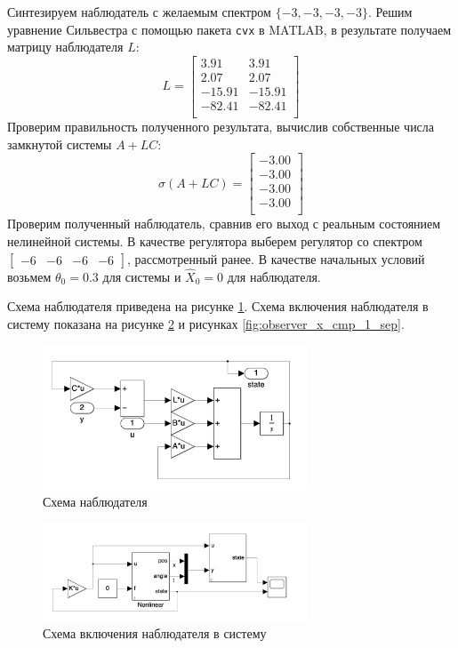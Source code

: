 Синтезируем наблюдатель с желаемым спектром $\{-3, -3, -3, -3\}$. 
Решим уравнение Сильвестра с помощью пакета \texttt{cvx} в MATLAB, в результате получаем матрицу наблюдателя $L$:
\begin{equation}
    L = \begin{bmatrix}
    3.91  & 3.91 \\ 
    2.07  & 2.07 \\ 
    -15.91  & -15.91 \\ 
    -82.41  & -82.41 \\ 
    \end{bmatrix}
\end{equation}
Проверим правильность полученного результата, вычислив собственные числа замкнутой системы $A + LC$: 
\begin{equation}
    \sigma(A + LC) = \begin{bmatrix}
    -3.00 \\ 
    -3.00 \\ 
    -3.00 \\ 
    -3.00 \\ 
    \end{bmatrix}
\end{equation}
Проверим полученный наблюдатель, сравнив его выход с реальным состоянием нелинейной системы. В качестве регулятора 
выберем регулятор со спектром $\begin{bmatrix}-6 & -6 & -6 & -6\end{bmatrix}$, рассмотренный ранее. В качестве 
начальных условий возьмем $\theta_0 = 0.3$ для системы и $\hat{X}_0 = 0$ для наблюдателя.

Схема наблюдателя приведена на рисунке \ref{fig:observer_scheme}. Схема включения наблюдателя в систему 
показана на рисунке \ref{fig:observer_system} и рисунках \ref{fig:observer_x_cmp_1_sep}. 
\begin{figure}[ht!]
    \centering
    \includegraphics[width=0.7\textwidth]{media/observer_scheme.png}
    \caption{Схема наблюдателя}
    \label{fig:observer_scheme}
\end{figure}
\begin{figure}[ht!]
    \centering
    \includegraphics[width=0.7\textwidth]{media/observer_system.png}
    \caption{Схема включения наблюдателя в систему}
    \label{fig:observer_system}
\end{figure}

